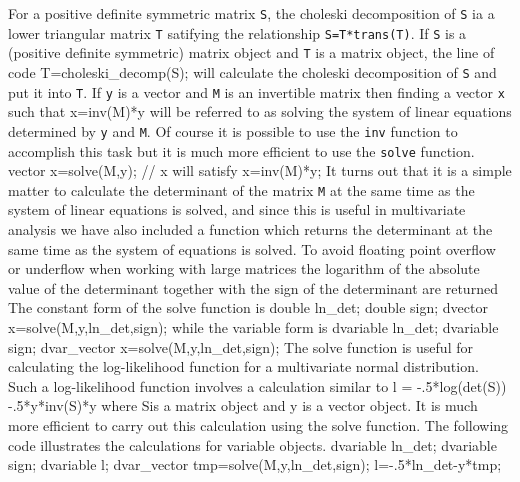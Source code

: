 For a positive definite symmetric matrix {\tt S}, the
choleski decomposition of {\tt S} ia a lower triangular matrix {\tt T}
satifying the relationship {\tt S=T*trans(T)}. 
If {\tt S} is a (positive definite symmetric) matrix object and
{\tt T} is a matrix object, the line of code
\beginexample
T=choleski_decomp(S);
\endexample
\noindent will calculate the choleski decomposition of {\tt S} and put it
into {\tt T}.
If {\tt y} is a vector and {\tt M} is an invertible matrix then finding
a vector {\tt x} such that
\beginexample
x=inv(M)*y
\endexample
\noindent will be referred to as solving the system of linear equations
determined by {\tt y} and {\tt M}. Of course it is possible
to use the {\tt inv} function to accomplish this task but it is much
more efficient to use the {\tt solve} function.
\beginexample
vector x=solve(M,y); // x will satisfy x=inv(M)*y;
\endexample
It turns out that it is a simple matter to calculate the determinant
of the matrix {\tt M} at the same time as the system of linear
equations is solved, and since this is useful in multivariate
analysis we have also included a function which returns the 
determinant at the same time as the system of equations is solved.
To avoid floating point overflow or underflow when working with
large matrices the logarithm of the absolute value of the
determinant together with the sign of the determinant are returned 
The constant form of the solve function is
\beginexample
double ln_det;
double sign;
dvector x=solve(M,y,ln_det,sign);
\endexample
\noindent while the variable form is
\beginexample
dvariable ln_det;
dvariable sign;
dvar_vector x=solve(M,y,ln_det,sign);
\endexample
The solve function is useful for calculating the log-likelihood
function for a multivariate normal distribution.
Such a log-likelihood function involves a calculation similar to
\beginexample
  l = -.5*log(det(S)) -.5*y*inv(S)*y
\endexample
\noindent where Sis a matrix object and y is a vector object.
It is much more efficient to carry out this calculation using
the solve function. The following code illustrates the
calculations for variable objects. 
\beginexample
   dvariable ln_det;
   dvariable sign;
   dvariable l;
   dvar_vector tmp=solve(M,y,ln_det,sign);
   l=-.5*ln_det-y*tmp;
\endexample

